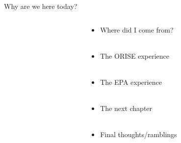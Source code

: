 \documentclass[serif]{beamer}\usepackage[]{graphicx}\usepackage[]{color}
\begin{document}
\begin{frame}{Why are we here today?}{}
\begin{columns}
\begin{column}{0.5\textwidth}
\onslide<+->
\begin{center}
\end{center}
\end{column}
\begin{column}{0.5\textwidth}
\begin{itemize}
\item<+-> Where did I come from? \\~\\
\item<+-> The ORISE experience \\~\\
\item<+-> The EPA experience \\~\\
\item<+-> The next chapter \\~\\
\item<+-> Final thoughts/ramblings 
\end{itemize}
\end{column}
\end{columns}\end{frame}
\end{document}
